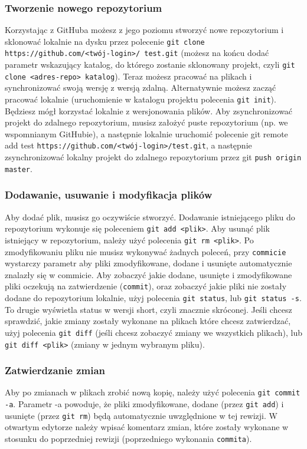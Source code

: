 \subsubsection{Tworzenie nowego repozytorium}
Korzystając z GitHuba możesz z jego poziomu stworzyć nowe repozytorium i sklonować lokalnie na dysku przez polecenie \texttt{git clone https://github.com/<twój-login>/ test.git} (możesz na końcu dodać parametr wskazujący katalog, do którego zostanie sklonowany projekt, czyli \texttt{git clone <adres-repo> katalog}). Teraz możesz pracować na plikach i synchronizować swoją wersję z wersją zdalną.
Alternatywnie możesz zacząć pracować lokalnie (uruchomienie w katalogu projektu polecenia \verb|git init|). Będziesz mógł korzystać lokalnie z wersjonowania plików. Aby zsynchronizować projekt do zdalnego repozytorium, musisz założyć puste repozytorium (np. we wspomnianym GitHubie), a następnie lokalnie uruchomić polecenie git remote add test \texttt{https://github.com/<twój-login>/test.git}, a następnie zsynchronizować lokalny projekt do zdalnego repozytorium przez git \texttt{push origin master}.

\subsubsection{Dodawanie, usuwanie i modyfikacja plików}
Aby dodać plik, musisz go oczywiście stworzyć. Dodawanie istniejącego pliku do repozytorium wykonuje się poleceniem \verb|git add <plik>|. Aby usunąć plik istniejący w repozytorium, należy użyć polecenia \verb|git rm <plik>|. Po zmodyfikowaniu pliku nie musisz wykonywać żadnych poleceń, przy \verb|commicie| wystarczy parametr aby pliki zmodyfikowane, dodane i usunięte automatycznie znalazły się w commicie.
Aby zobaczyć jakie dodane, usunięte i zmodyfikowane pliki oczekują na zatwierdzenie (\verb|commit|), oraz zobaczyć jakie pliki nie zostały dodane do repozytorium lokalnie, użyj polecenia \verb|git status|, lub \verb|git status -s|. To drugie wyświetla status w wersji short, czyli znacznie skróconej.
Jeśli chcesz sprawdzić, jakie zmiany zostały wykonane na plikach które chcesz zatwierdzać, użyj polecenia \verb|git diff| (jeśli chcesz zobaczyć zmiany we wszystkich plikach), lub \verb|git diff <plik>| (zmiany w jednym wybranym pliku).

\subsubsection{Zatwierdzanie zmian}
Aby po zmianach w plikach zrobić nową kopię, należy użyć polecenia \verb|git commit -a|. Parametr -a powoduje, że pliki zmodyfikowane, dodane (przez \verb|git add|) i usunięte (przez \verb|git rm|) będą automatycznie uwzględnione w tej rewizji. W otwartym edytorze należy wpisać komentarz zmian, które zostały wykonane w stosunku do poprzedniej rewizji (poprzedniego wykonania \verb|commita|).

